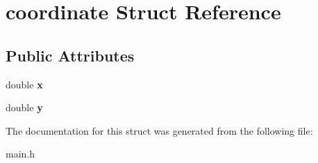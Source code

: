 \hypertarget{structcoordinate}{\section{coordinate Struct Reference}
\label{structcoordinate}
}
\subsection*{Public Attributes}
\begin{DoxyCompactItemize}
\item 
\hypertarget{structcoordinate_a3a164e660f2488a90d90f349d3b02010}{double {\bfseries x}}\label{structcoordinate_a3a164e660f2488a90d90f349d3b02010}

\item 
\hypertarget{structcoordinate_a11b4100f0f7449334bd3957db9be03cc}{double {\bfseries y}}\label{structcoordinate_a11b4100f0f7449334bd3957db9be03cc}

\end{DoxyCompactItemize}


The documentation for this struct was generated from the following file\-:\begin{DoxyCompactItemize}
\item 
main.\-h\end{DoxyCompactItemize}
